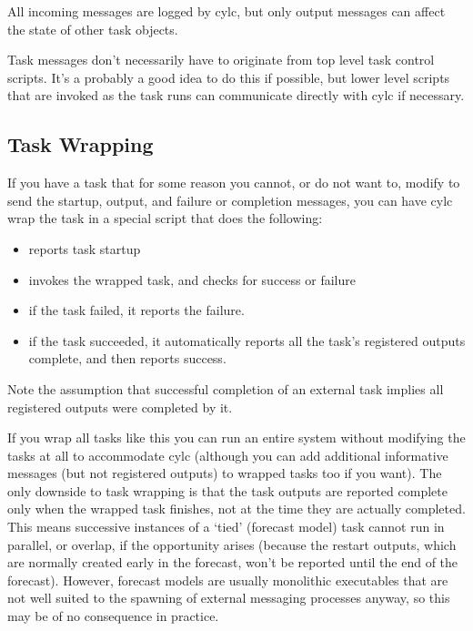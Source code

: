 \documentclass[11pt,a4paper]{article}
\begin{document}
All incoming messages are logged by cylc, but only output messages can
affect the state of other task objects.

Task messages don't necessarily have to originate from top level task
control scripts. It's a probably a good idea to do this if possible, but
lower level scripts that are invoked as the task runs can communicate
directly with cylc if necessary.

\subsection{Task Wrapping}
\label{TaskWrapping}

If you have a task that for some reason you cannot, or do not want to,
modify to send the startup, output, and failure or completion messages, 
you can have cylc wrap the task in a special script that does the following:

\begin{itemize}
    \item reports task startup
    \item invokes the wrapped task, and checks for success or failure
    \item if the task failed, it reports the failure. 
    \item if the task succeeded, it automatically reports all the task's
        registered outputs complete, and then reports success.
\end{itemize}

Note the assumption that successful completion of an external task
implies all registered outputs were completed by it.

If you wrap all tasks like this you can run an entire system without
modifying the tasks at all to accommodate cylc (although you can 
add additional informative messages (but not registered outputs) to
wrapped tasks too if you want). The only downside to task wrapping is
that the task outputs are reported complete only when the wrapped
task finishes, not at the time they are actually completed. This means
successive instances of a `tied' (forecast model) task cannot run in
parallel, or overlap, if the opportunity arises (because the restart
outputs, which are normally created early in the forecast, won't be
reported until the end of the forecast).  However, forecast models are
usually monolithic executables that are not well suited to the spawning
of external messaging processes anyway, so this may be of no consequence
in practice.
\end{document}
